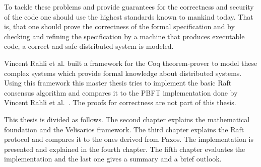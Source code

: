 To tackle these problems and provide guarantees for the correctness and
security of the code one should use the highest standards known to mankind
today. That is, that one should prove the correctness of the formal specification and
by checking and refining the specification by a machine that produces
executable code, a correct and safe distributed system is modeled.~\cite{rahli2018velisarios}

Vincent Rahli et al. built a framework for the Coq theorem-prover
to model these complex systems which provide formal knowledge about distributed
systems. Using this framework this master thesis tries to implement
the basic Raft consensus algorithm and compares it to the PBFT implementation
done by Vincent Rahli et al.~\cite{rahli2018velisarios}.
The proofs for correctness are not part of this thesis.

This thesis is divided as follows. The second chapter explains the
mathematical foundation and the Velisarios framework. The third chapter
explains the Raft protocol and compares it to the ones derived from Paxos.
The implementation is presented and explained in the fourth chapter. The fifth chapter
evaluates the implementation and the last one gives a summary and a
brief outlook.


